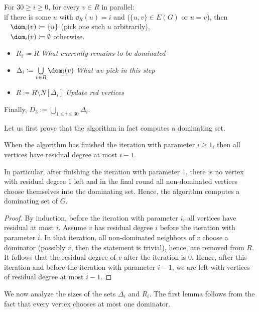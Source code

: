 \begin{tcolorbox}[colback=red!5!white,colframe=red!50!black]
  For $30\geq i\geq 0$,  for every $v\in R$ in parallel:\\[2mm]
  if there is some $u$ with $\dd_R(u)=i$ and ($\{u,v\}\in E(G)$ or $u=v$), then\\
  \mbox{ } $\dom_i(v)\coloneqq \{u\}$ (pick one such $u$ arbitrarily),\\
  \mbox{ } $\dom_i(v)\coloneqq \emptyset$ otherwise.
  \begin{itemize}
    \item $R_i \coloneqq R$ \hfill \textit{\small What currently remains to be dominated}
    \item $\Delta_i \coloneqq \bigcup\limits_{v\in R} \dom_i(v)$ \hfill \textit{\small What we pick in this step}
    \item $R \coloneqq R \setminus N[\Delta_{i}]$ \hfill \textit{\small Update red vertices}
  \end{itemize}
  Finally, $D_3:=  \bigcup\limits_{1\le i\le 30} \Delta_i$.
\end{tcolorbox}

\smallskip
Let us first prove that the algorithm in fact computes a dominating set.
\begin{lemma}\label{lem:correctness}
  When the algorithm has finished the iteration with parameter
  $i\geq 1$, then all vertices have residual degree at most $i-1$.
\end{lemma}

In particular, after finishing the iteration with parameter $1$, there
is no vertex with residual degree $1$ left and in the final round all
non-dominated vertices choose themselves into the dominating
set. Hence, the algorithm computes a dominating set of $G$.

\begin{proof}
  By induction, before the iteration with parameter $i$, all vertices
  have residual at most $i$. Assume $v$ has residual degree $i$ before
  the iteration with parameter $i$.  In that iteration, all
  non-dominated neighbors of $v$ choose a dominator (possibly $v$, then
  the statement is trivial),
  hence, are removed from $R$. It follows that the residual degree of $v$ after
  the iteration is $0$. Hence, after this iteration and before the
  iteration with parameter $i-1$, we are left with vertices of
  residual degree at most $i-1$.
\end{proof}

We now analyze the sizes of the sets $\Delta_i$ and $R_i$. The first
lemma follows from the fact that every vertex chooses at most one
dominator.

